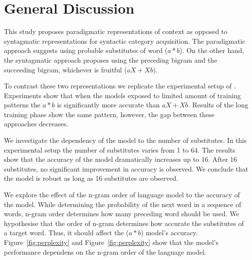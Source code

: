 \section{General Discussion}

This study proposes paradigmatic representations of context as opposed to
syntagmatic representations for syntactic category acquisition. The
paradigmatic approach suggests using probable substitutes of word ($a*b$). On
the other hand, the syntagmatic approach proposes using the preceding bigram
and the succeeding bigram, whichever is fruitful ($aX + Xb$).

To contrast these two representations we replicate the experimental
setup of \cite{clair2010}. Experiments show that when the models exposed to
limited amount of training patterns the $a*b$ is significantly more accurate
than $aX + Xb$. Results of the long training phase show the same pattern, however,
the gap between these approaches decreases.

We investigate the dependency of the model to the number of substitutes. In
this experimental setup the number of substitutes varies from 1 to 64. The
results show that the accuracy of the model dramatically increases up to 16.
After 16 substitutes, no significant improvement in accuracy is observed. We
conclude that the model is robust as long as 16 substitutes are observed.

We explore the effect of the n-gram order of language model to the accuracy of
the model. While determining the probability of the next word in a sequence of
words, n-gram order determines how many preceding word should be used.  We
hypothesise that the order of n-gram determines how accurate the substitutes of a
target word. Thus, it should affect the ($a*b$) model's accuracy.
Figure~\ref{fig:perplexity} and Figure~\ref{fig:perplexity} show that the
model's performance dependens on the n-gram order of the language model.
